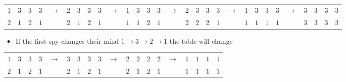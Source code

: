 \begin{tabular}{lllllllllllllllllllllllllllll}
  $1$&$3$&$3$&$3$ &\multirow{2}{*}{$\rightarrow$}& $2$&$3$&$3$&$3$ &\multirow{2}{*}{$\rightarrow$}& $1$&$3$&$3$&$3$ &\multirow{2}{*}{$\rightarrow$}& $2$&$3$&$3$&$3$ &\multirow{2}{*}{$\rightarrow$}& $1$&$3$&$3$&$3$ &\multirow{2}{*}{$\rightarrow$}& $3$&$3$&$3$&$3$ \\
  $2$&$1$&$2$&$1$ && $2$&$1$&$2$&$1$ && $1$&$1$&$2$&$1$ && $2$&$2$&$2$&$1$ && $1$&$1$&$1$&$1$ && $3$&$3$&$3$&$3$
\end{tabular}

\begin{itemize}
  \item If the first spy changes their mind $1\rightarrow3\rightarrow2\rightarrow1$ the table will change
\end{itemize}

\begin{tabular}{lllllllllllllllllll}
  $1$&$3$&$3$&$3$ &\multirow{2}{*}{$\rightarrow$}& $3$&$3$&$3$&$3$ &\multirow{2}{*}{$\rightarrow$}& $2$&$2$&$2$&$2$ &\multirow{2}{*}{$\rightarrow$}& $1$&$1$&$1$&$1$ \\
  $2$&$1$&$2$&$1$ && $2$&$1$&$2$&$1$ && $2$&$1$&$2$&$1$ && $1$&$1$&$1$&$1$
\end{tabular}

